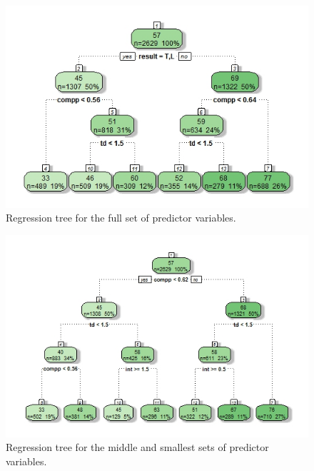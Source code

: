 \documentclass[12pt]{article}\usepackage[]{graphicx}\usepackage[]{color}
\begin{document}
\begin{figure}[h]
\centering
\includegraphics[width=1.1\textwidth]{tree1.jpeg}
\captionsetup{font=footnotesize,labelfont=footnotesize}
\caption{\label{fig:tree1} Regression tree for the full set of predictor variables.}
\end{figure}
\newpage

\begin{figure}[h]
\centering
\includegraphics[width=1.1\textwidth]{tree2.jpeg}
\captionsetup{font=footnotesize,labelfont=footnotesize}
\caption{\label{fig:tree2} Regression tree for the middle and smallest sets of predictor variables.}
\end{figure}

\newpage
\end{document}
